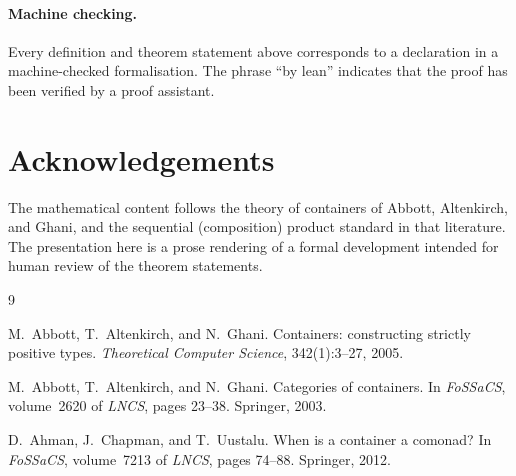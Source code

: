 \documentclass[11pt,a4paper]{article}
\theoremstyle{plain}
\theoremstyle{definition}
\begin{document}
\paragraph{Machine checking.}
Every definition and theorem statement above corresponds to a declaration
in a machine-checked formalisation. The phrase ``by lean'' indicates that
the proof has been verified by a proof assistant.

\section*{Acknowledgements}

The mathematical content follows the theory of containers of Abbott,
Altenkirch, and Ghani, and the sequential (composition) product standard
in that literature. The presentation here is a prose rendering of a
formal development intended for human review of the theorem statements.

\begin{thebibliography}{9}

M.~Abbott, T.~Altenkirch, and N.~Ghani.
\newblock Containers: constructing strictly positive types.
\newblock \emph{Theoretical Computer Science}, 342(1):3--27, 2005.

M.~Abbott, T.~Altenkirch, and N.~Ghani.
\newblock Categories of containers.
\newblock In \emph{FoSSaCS}, volume~2620 of \emph{LNCS}, pages 23--38.
\newblock Springer, 2003.

D.~Ahman, J.~Chapman, and T.~Uustalu.
\newblock When is a container a comonad?
\newblock In \emph{FoSSaCS}, volume~7213 of \emph{LNCS}, pages 74--88.
\newblock Springer, 2012.

\end{thebibliography}
\end{document}
